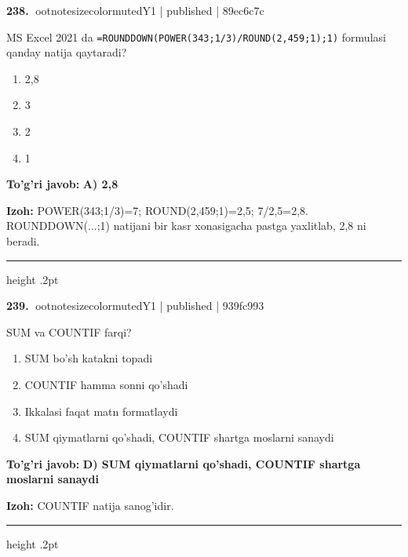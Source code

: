 \documentclass[10pt,a4paper]{article}
\begin{document}
\textbf{\color{ink}238.} {ootnotesizecolor{muted}Y1 | published | 89ec6c7c}
\par
MS Excel 2021 da \texttt{=ROUNDDOWN(POWER(343;1/3)/ROUND(2,459;1);1)} formulasi qanday natija qaytaradi?
\begin{enumerate}[label=\Alph*),leftmargin=9mm]
\item 2,8
\item 3
\item 2
\item 1
\end{enumerate}
\begin{tcolorbox}[enhanced,breakable,colback=teal!4,colframe=teal!55!black,boxrule=0.45pt,arc=1.2mm,left=2.8mm,right=2.8mm,top=2mm,bottom=2mm]
\textbf{\color{teal}To'g'ri javob:} \textbf{A) 2,8}
\par\smallskip
\textbf{Izoh:} POWER(343;1/3)=7; ROUND(2,459;1)=2,5; 7/2,5=2,8. ROUNDDOWN(...;1) natijani bir kasr xonasigacha pastga yaxlitlab, 2,8 ni beradi.
\end{tcolorbox}
\vspace{2mm}\hrule height .2pt\vspace{2mm}

\textbf{\color{ink}239.} {ootnotesizecolor{muted}Y1 | published | 939fc993}
\par
SUM va COUNTIF farqi?
\begin{enumerate}[label=\Alph*),leftmargin=9mm]
\item SUM bo'sh katakni topadi
\item COUNTIF hamma sonni qo'shadi
\item Ikkalasi faqat matn formatlaydi
\item SUM qiymatlarni qo'shadi, COUNTIF shartga moslarni sanaydi
\end{enumerate}
\begin{tcolorbox}[enhanced,breakable,colback=teal!4,colframe=teal!55!black,boxrule=0.45pt,arc=1.2mm,left=2.8mm,right=2.8mm,top=2mm,bottom=2mm]
\textbf{\color{teal}To'g'ri javob:} \textbf{D) SUM qiymatlarni qo'shadi, COUNTIF shartga moslarni sanaydi}
\par\smallskip
\textbf{Izoh:} COUNTIF natija sanog'idir.
\end{tcolorbox}
\vspace{2mm}\hrule height .2pt\vspace{2mm}
\end{document}
